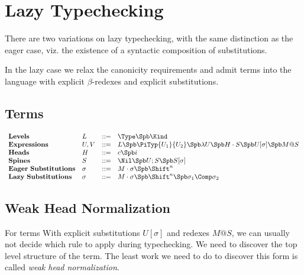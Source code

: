 
\section{Lazy Typechecking}

There are two variations on lazy typechecking, with the
same distinction as the eager case, viz. the existence
of a syntactic composition of substitutions.

In the lazy case we relax the canonicity requirements and 
admit terms into the language with explicit $\beta$-redexes
and explicit substitutions.


\subsection{Terms}

$$
\begin{array}{llll}
\mathbf{Levels} & L & ::= & \Type \Spb \Kind \\
\mathbf{Expressions} & U,V & ::= & L \Spb \PiTyp{U_1}{U_2} \Spb \lambda U \Spb H\cdot S \Spb U[\sigma] \Spb M @ S\\
\mathbf{Heads} & H & ::= & c \Spb i\\
\mathbf{Spines} & S & ::= & \Nil \Spb U;S \Spb S[\sigma]\\
\mathbf{Eager\ Substitutions} & \sigma & ::= & M\cdot\sigma \Spb \Shift^n \\
\mathbf{Lazy\ Substitutions} & \sigma & ::= & M\cdot\sigma \Spb \Shift^n \Spb \sigma_1 \Comp \sigma_2\\
\end{array} 
$$


\subsection{Weak Head Normalization}

\newcommand{\Weak}{\hookrightarrow}

For terms With explicit substitutions $U[\sigma]$ and redexes $M @ S$,
we can usually not decide which rule to apply during typechecking.
We need to discover the top level structure of the term.  
The least work we need to do to discover this form is called 
\emph{weak head normalization}.  



